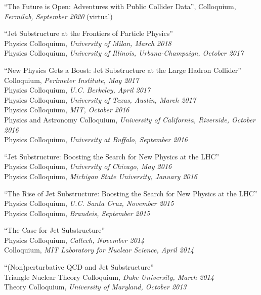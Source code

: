 \item ``The Future is Open:  Adventures with Public Collider Data'', Colloquium, \emph{Fermilab, September 2020} (virtual)

\item ``Jet Substructure at the Frontiers of Particle Physics''
\\ \sh Physics Colloquium, \emph{University of Milan, March 2018}
\\ \sh Physics Colloquium, \emph{University of Illinois, Urbana-Champaign, October 2017}

\item ``New Physics Gets a Boost:  Jet Substructure at the Large Hadron Collider''
\\ \sh Colloquium, \emph{Perimeter Institute, May 2017}
\\ \sh Physics Colloquium, \emph{U.C. Berkeley, April 2017}
\\ \sh Physics Colloquium, \emph{University of Texas, Austin, March 2017}
\\ \sh Physics Colloquium, \emph{MIT, October 2016}
\\ \sh Physics and Astronomy Colloquium, \emph{University of California, Riverside, October 2016}
\\ \sh Physics Colloquium, \emph{University at Buffalo, September 2016}

\item ``Jet Substructure:  Boosting the Search for New Physics at the LHC''
\\ \sh Physics Colloquium, \emph{University of Chicago, May 2016}
\\ \sh Physics Colloquium, \emph{Michigan State University, January 2016}

\item ``The Rise of Jet Substructure:  Boosting the Search for New Physics at the LHC''
\\ \sh Physics Colloquium, \emph{U.C. Santa Cruz, November 2015}
\\ \sh Physics Colloquium, \emph{Brandeis, September 2015}

\item ``The Case for Jet Substructure''
\\ \sh Physics Colloquium, \emph{Caltech, November 2014}
\\ \sh Colloquium, \emph{MIT Laboratory for Nuclear Science, April 2014}

\item ``(Non)perturbative QCD and Jet Substructure''
\\ \sh Triangle Nuclear Theory Colloquium, \emph{Duke University, March 2014}
\\ \sh Theory Colloquium, \emph{University of Maryland, October 2013}

